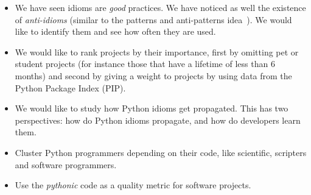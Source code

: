\documentclass[a4paper]{article}
\begin{document}
\begin{itemize}
  
  \item We have seen idioms are \emph{good} practices. We have noticed as well the existence of \emph{anti-idioms} (similar to the patterns and anti-patterns idea~\cite{brown1998antipatterns}). We would like to identify them and see how often they are used.
  
  \item We would like to rank projects by their importance, first by omitting pet or student projects (for instance those that have a lifetime of less than 6 months) and second by giving a weight to projects by using data from the Python Package Index (PIP).
  
  \item We would like to study how Python idioms get propagated. This has two perspectives: how do Python idioms propagate, and how do developers learn them.
  
  \item Cluster Python programmers depending on their code, like scientific, scripters and software programmers.
  
  \item Use the \textit{pythonic} code as a quality metric for software projects.

\end{itemize}

 


\end{document}
